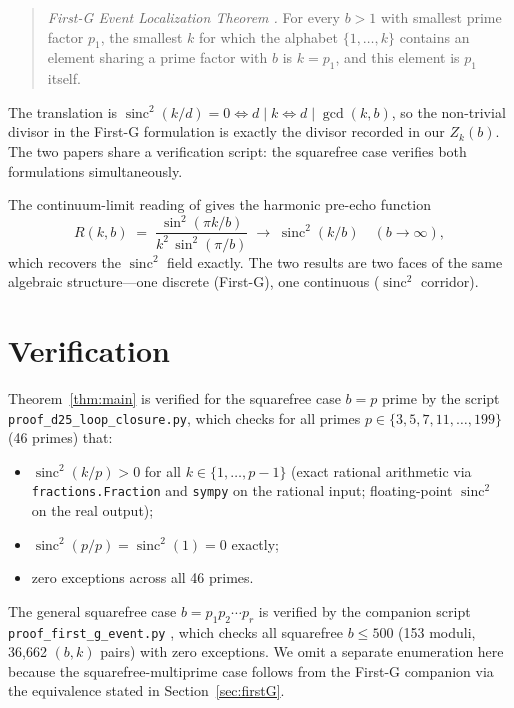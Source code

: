 \documentclass[11pt,reqno]{amsart}
\theoremstyle{plain}
\theoremstyle{remark}
\DeclareMathOperator{\sinc}{sinc}
\begin{document}
\begin{quote}
\emph{First-G Event Localization Theorem \cite{J04}.} For every
$b > 1$ with smallest prime factor $p_1$, the smallest $k$ for
which the alphabet $\{1, \ldots, k\}$ contains an element sharing
a prime factor with $b$ is $k = p_1$, and this element is $p_1$
itself.
\end{quote}

The translation is
$\sinc^2(k/d) = 0 \iff d \mid k \iff d \mid \gcd(k, b)$, so the
non-trivial divisor in the First-G formulation is exactly the
divisor recorded in our $Z_k(b)$. The two papers share a
verification script: the squarefree case verifies both
formulations simultaneously.

The continuum-limit reading of \cite{J04} gives the harmonic
pre-echo function
\begin{equation}\label{eq:R}
  R(k, b) \;=\; \frac{\sin^2(\pi k / b)}{k^2 \, \sin^2(\pi/b)}
  \;\longrightarrow\; \sinc^2(k/b) \quad (b \to \infty),
\end{equation}
which recovers the $\sinc^2$ field exactly. The two results are
two faces of the same algebraic structure---one discrete (First-G),
one continuous ($\sinc^2$ corridor).

\section{Verification}\label{sec:verify}

Theorem~\ref{thm:main} is verified for the squarefree case
$b = p$ prime by the script
\texttt{proof\_d25\_loop\_closure.py}, which checks for all primes
$p \in \{3, 5, 7, 11, \ldots, 199\}$ (46 primes) that:
\begin{itemize}\setlength\itemsep{1pt}
  \item $\sinc^2(k/p) > 0$ for all $k \in \{1, \ldots, p-1\}$
        (exact rational arithmetic via \texttt{fractions.Fraction}
        and \texttt{sympy} on the rational input; floating-point
        $\sinc^2$ on the real output);
  \item $\sinc^2(p/p) = \sinc^2(1) = 0$ exactly;
  \item zero exceptions across all 46 primes.
\end{itemize}
The general squarefree case $b = p_1 p_2 \cdots p_r$ is verified by
the companion script \texttt{proof\_first\_g\_event.py}
\cite{J04proof}, which checks all squarefree $b \le 500$ (153
moduli, 36{,}662 $(b, k)$ pairs) with zero exceptions. We omit a
separate enumeration here because the squarefree-multiprime case
follows from the First-G companion via the equivalence stated in
Section~\ref{sec:firstG}.
\end{document}
